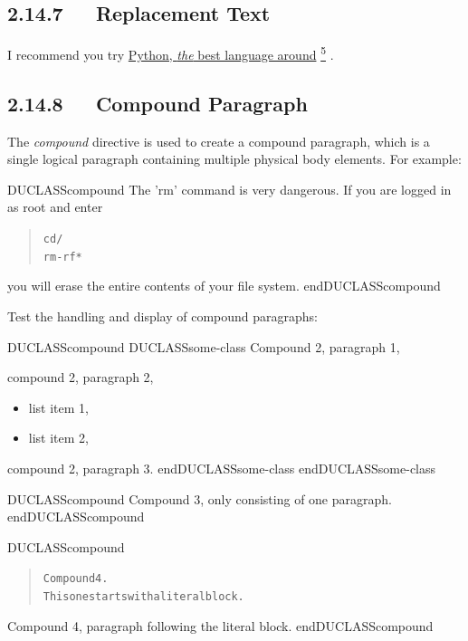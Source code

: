 \documentclass[a4paper]{memoir}
\newenvironment{DUclass}[1]%
  {%
   \def\DocutilsClassFunctionName{DUCLASS#1}
     \csname \DocutilsClassFunctionName \endcsname}%
  {\csname end\DocutilsClassFunctionName \endcsname}%
\providecommand*{\DUfootnotemark}[3]{%
  \raisebox{1em}{\hypertarget{#1}{}}%
  \hyperlink{#2}{\textsuperscript{#3}}%
}
\begin{document}
\subsection{2.14.7   Replacement Text%
  \label{replacement-text}%
}

I recommend you try \href{http://www.python.org/}{Python, \emph{the} best language around}\DUfootnotemark{footnote-reference-12}{footnote-6}{5}.


\subsection{2.14.8   Compound Paragraph%
  \label{compound-paragraph}%
}

The \emph{compound} directive is used to create a \textquotedbl{}compound paragraph\textquotedbl{}, which
is a single logical paragraph containing multiple physical body
elements. For example:

\begin{DUclass}{compound}
The 'rm' command is very dangerous.  If you are logged
in as root and enter
\begin{quote}
\begin{alltt}
cd /
rm -rf *
\end{alltt}
\end{quote}
you will erase the entire contents of your file system.
\end{DUclass}

Test the handling and display of compound paragraphs:

\begin{DUclass}{compound}
\begin{DUclass}{some-class}
Compound 2, paragraph 1,

compound 2, paragraph 2,
\begin{itemize}
\item list item 1,

\item list item 2,
\end{itemize}
compound 2, paragraph 3.
\end{DUclass}
\end{DUclass}

\begin{DUclass}{compound}
Compound 3, only consisting of one paragraph.
\end{DUclass}

\begin{DUclass}{compound}
\begin{quote}
\begin{alltt}
Compound 4.
This one starts with a literal block.
\end{alltt}
\end{quote}
Compound 4, paragraph following the literal block.
\end{DUclass}
\end{document}
